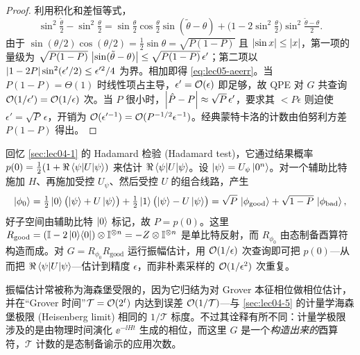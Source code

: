 \begin{proof}
利用积化和差恒等式，
\[
  \sin^2\tfrac{\tilde\theta}{2}-\sin^2\tfrac{\theta}{2}
   =\sin\tfrac{\theta}{2}\cos\tfrac{\theta}{2}\sin(\tilde\theta-\theta)
    +\bigl(1-2\sin^2\tfrac{\theta}{2}\bigr)\sin^2\tfrac{\tilde\theta-\theta}{2}.
\]
由于 $\sin(\theta/2)\cos(\theta/2)=\tfrac12\sin\theta=\sqrt{P(1-P)}$ 且 $\left\lvert \sin x \right\rvert\le\left\lvert x \right\rvert$，第一项的量级为
$\sqrt{P(1-P)}\,\left\lvert \sin(\tilde\theta-\theta) \right\rvert\le\sqrt{P(1-P)}\,\epsilon'$；第二项以
$\left\lvert 1-2P \right\rvert\sin^2(\epsilon'/2)\le\epsilon'^2/4$ 为界。相加即得
\eqref{eq:lec05-aeerr}。当 $P(1-P)=\Theta(1)$ 时线性项占主导，$\epsilon'=\mathcal{O}(\epsilon)$ 即足够，故 QPE 对 $G$ 共查询 $\mathcal{O}(1/\epsilon')=\mathcal{O}(1/\epsilon)$ 次。当 $P$ 很小时，$\left\lvert \hat P-P \right\rvert\approx\sqrt P\,\epsilon'$，要求其 $<P\epsilon$ 则迫使 $\epsilon'=\sqrt P\,\epsilon$，开销为 $\mathcal{O}(\epsilon'^{-1})=\mathcal{O}(P^{-1/2}\epsilon^{-1})$。经典蒙特卡洛的计数由伯努利方差 $P(1-P)$ 得出。
\end{proof}

\begin{example}[加速 Hadamard 检验]
\label{exa:lec05-hadamard}
回忆 \cref{sec:lec04-1} 的 Hadamard 检验 (Hadamard test)，它通过结果概率
$p(0)=\tfrac12(1+\Re\braket{\psi|U|\psi})$ 来估计 $\Re\braket{\psi|U|\psi}$。设 $\ket{\psi}=U_\psi\ket{0^n}$。对一个辅助比特施加 $H$、再施加受控 $U_\psi$、然后受控 $U$ 的组合线路，产生
\[
  \ket{\phi_0}=\tfrac12\ket{0}\bigl(\ket{\psi}+U\ket{\psi}\bigr)
              +\tfrac12\ket{1}\bigl(\ket{\psi}-U\ket{\psi}\bigr)
             =\sqrt{P}\,\ket{\phi_{\mathrm{good}}}
              +\sqrt{1-P}\,\ket{\phi_{\mathrm{bad}}},
\]
好子空间由辅助比特 $\ket{0}$ 标记，故 $P=p(0)$。这里 $R_{\mathrm{good}}=(\mathbb{I}-2\ket{0}\!\bra{0})\otimes\mathbb{I}^{\otimes n}
=-Z\otimes\mathbb{I}^{\otimes n}$ 是单比特反射，而 $R_{\phi_0}$ 由态制备酉算符构造而成。对 $G=R_{\phi_0}R_{\mathrm{good}}$ 运行振幅估计，用 $\mathcal{O}(1/\epsilon)$ 次查询即可把 $p(0)$---从而把 $\Re\braket{\psi|U|\psi}$---估计到精度 $\epsilon$，而非朴素采样的 $\mathcal{O}(1/\epsilon^2)$ 次重复。
\end{example}

\begin{remark}
\label{rem:lec05-heisenberg}
振幅估计常被称为海森堡受限的，因为它归结为对 Grover 本征相位做相位估计，并在``Grover 时间''$\mathcal T=\mathcal{O}(2^{t})$ 内达到误差 $\mathcal{O}(1/\mathcal T)$---与 \cref{sec:lec04-5} 的计量学海森堡极限 (Heisenberg limit) 相同的 $1/\mathcal T$ 标度。不过其诠释有所不同：计量学极限涉及的是由物理时间演化 $\ee^{-\ii Ht}$ 生成的相位，而这里 $G$ 是一个\emph{构造出来的}酉算符，$\mathcal T$ 计数的是态制备谕示的应用次数。
\end{remark}

